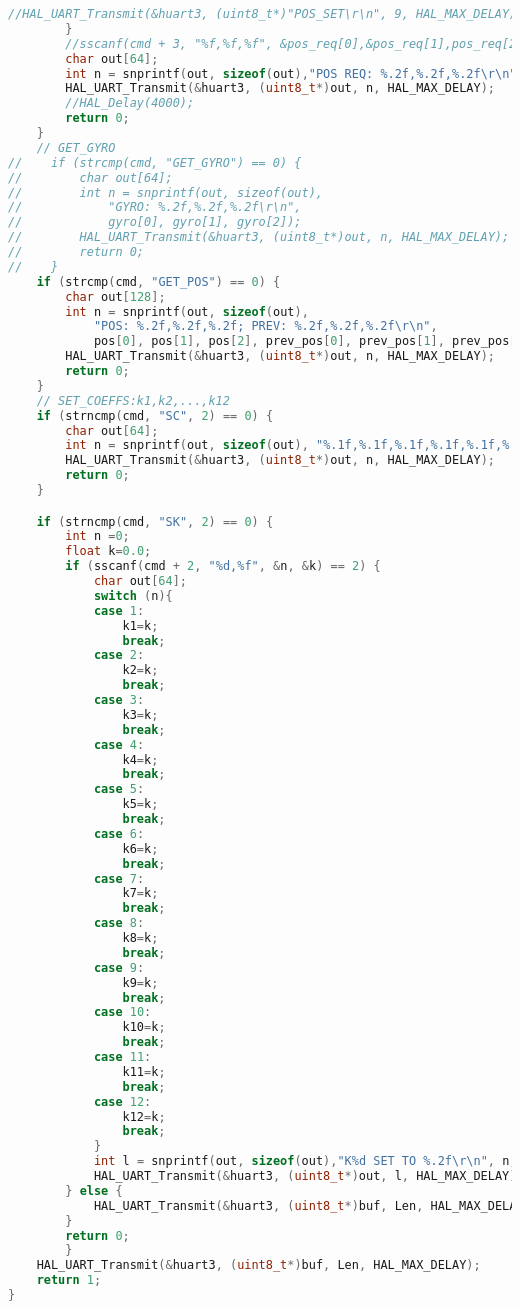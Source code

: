 \begin{lstlisting}[language=C++]
            //HAL_UART_Transmit(&huart3, (uint8_t*)"POS_SET\r\n", 9, HAL_MAX_DELAY);
        }
        //sscanf(cmd + 3, "%f,%f,%f", &pos_req[0],&pos_req[1],pos_req[2]);
        char out[64];
        int n = snprintf(out, sizeof(out),"POS REQ: %.2f,%.2f,%.2f\r\n", pos_req[0], pos_req[1], pos_req[2]);
        HAL_UART_Transmit(&huart3, (uint8_t*)out, n, HAL_MAX_DELAY);
        //HAL_Delay(4000);
        return 0;
    }
    // GET_GYRO
//    if (strcmp(cmd, "GET_GYRO") == 0) {
//        char out[64];
//        int n = snprintf(out, sizeof(out),
//            "GYRO: %.2f,%.2f,%.2f\r\n",
//            gyro[0], gyro[1], gyro[2]);
//        HAL_UART_Transmit(&huart3, (uint8_t*)out, n, HAL_MAX_DELAY);
//        return 0;
//    }
    if (strcmp(cmd, "GET_POS") == 0) {
        char out[128];
        int n = snprintf(out, sizeof(out),
            "POS: %.2f,%.2f,%.2f; PREV: %.2f,%.2f,%.2f\r\n",
            pos[0], pos[1], pos[2], prev_pos[0], prev_pos[1], prev_pos[2]);
        HAL_UART_Transmit(&huart3, (uint8_t*)out, n, HAL_MAX_DELAY);
        return 0;
    }
    // SET_COEFFS:k1,k2,...,k12
    if (strncmp(cmd, "SC", 2) == 0) {
        char out[64];
        int n = snprintf(out, sizeof(out), "%.1f,%.1f,%.1f,%.1f,%.1f,%.1f,%.1f,%.1f,%.1f,%.1f,%.1f,%.1f\r\n", k1,k2,k3,k4,k5,k6,k7,k8,k9,k10,k11,k12);
        HAL_UART_Transmit(&huart3, (uint8_t*)out, n, HAL_MAX_DELAY);
        return 0;
    }

    if (strncmp(cmd, "SK", 2) == 0) {
        int n =0;
        float k=0.0;
        if (sscanf(cmd + 2, "%d,%f", &n, &k) == 2) {
            char out[64];
            switch (n){
            case 1:
                k1=k;
                break;
            case 2:
                k2=k;
                break;
            case 3:
                k3=k;
                break;
            case 4:
                k4=k;
                break;
            case 5:
                k5=k;
                break;
            case 6:
                k6=k;
                break;
            case 7:
                k7=k;
                break;
            case 8:
                k8=k;
                break;
            case 9:
                k9=k;
                break;
            case 10:
                k10=k;
                break;
            case 11:
                k11=k;
                break;
            case 12:
                k12=k;
                break;
            }
            int l = snprintf(out, sizeof(out),"K%d SET TO %.2f\r\n", n,k);
            HAL_UART_Transmit(&huart3, (uint8_t*)out, l, HAL_MAX_DELAY);
        } else {
            HAL_UART_Transmit(&huart3, (uint8_t*)buf, Len, HAL_MAX_DELAY);
        }
        return 0;
        }
    HAL_UART_Transmit(&huart3, (uint8_t*)buf, Len, HAL_MAX_DELAY);
    return 1;
}


\end{lstlisting}
